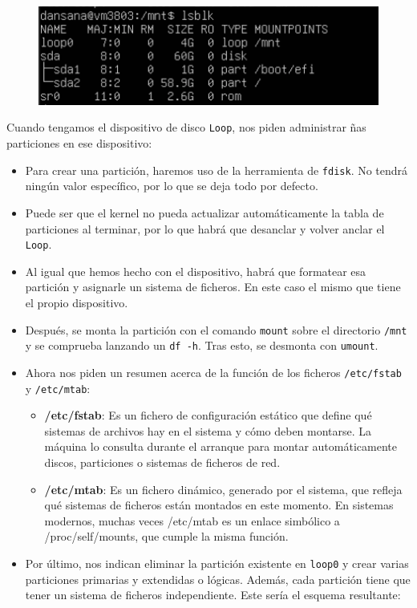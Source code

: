 \documentclass[10pt]{article}
\begin{document}
	\begin{figure}[H]
		\setlength{\abovecaptionskip}{0cm}
		\setlength{\belowcaptionskip}{0cm}
		\centering
		\includegraphics[width=0.6\linewidth]{Recursos/loop0.png}
		\label{fig:loop}
	\end{figure}
	
	Cuando tengamos el dispositivo de disco \verb|Loop|, nos piden administrar ñas particiones en ese dispositivo:
	\begin{itemize}
		\item Para crear una partición, haremos uso de la herramienta de \verb|fdisk|. No tendrá ningún valor específico, por lo que se deja todo por defecto.
		\item Puede ser que el kernel no pueda actualizar automáticamente la tabla de particiones al terminar, por lo que habrá que desanclar y volver anclar el \verb|Loop|.
		\item Al igual que hemos hecho con el dispositivo, habrá que formatear esa partición y asignarle un sistema de ficheros. En este caso el mismo que tiene el propio dispositivo.
		\item Después, se monta la partición con el comando \verb|mount| sobre el directorio \verb|/mnt| y se comprueba lanzando un \verb|df -h|. Tras esto, se desmonta con \verb|umount|.
		\item Ahora nos piden un resumen acerca de la función de los ficheros \verb|/etc/fstab| y \verb|/etc/mtab|:
		\begin{itemize}
			\item \textbf{/etc/fstab}: Es un fichero de configuración estático que define qué sistemas de archivos hay en el sistema y cómo deben montarse. La máquina lo consulta durante el arranque para montar automáticamente discos, particiones o sistemas de ficheros de red.
			\item \textbf{/etc/mtab}: Es un fichero dinámico, generado por el sistema, que refleja qué sistemas de ficheros están montados en este momento. En sistemas modernos, muchas veces /etc/mtab es un enlace simbólico a /proc/self/mounts, que cumple la misma función.
		\end{itemize}
		\item Por último, nos indican eliminar la partición existente en \verb|loop0| y crear varias particiones primarias y extendidas o lógicas. Además, cada partición tiene que tener un sistema de ficheros independiente. Este sería el esquema resultante:

\end{itemize}
\end{document}
